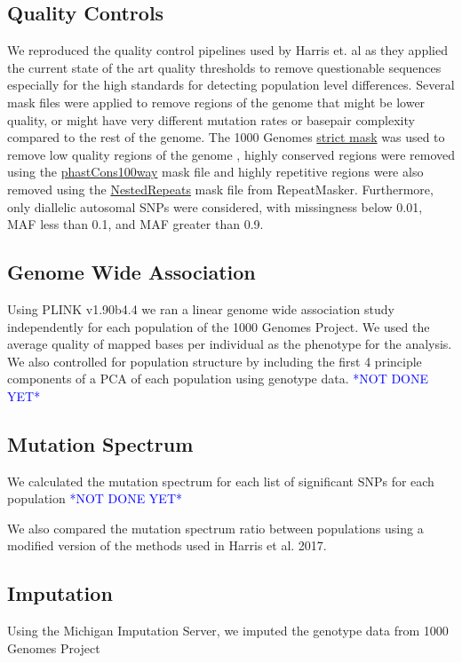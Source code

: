 \documentclass[]{elife}
\newcommand{\todo}[1]{\textcolor{blue}{*#1*}}
\begin{document}
\subsection{Quality Controls}
We reproduced the quality control pipelines used by Harris et. al as they applied the current state of the art quality thresholds to remove questionable sequences especially for the high standards for detecting population level differences. 
Several mask files were applied to remove regions of the genome that might be lower quality, or might have very different mutation rates or basepair complexity compared to the rest of the genome. 
The  1000 Genomes \href{http://ftp.1000genomes.ebi.ac.uk/vol1/ftp/release/20130502/supporting/accessible_genome_masks/20141020.strict_mask.whole_genome.bed}{strict mask} was used to remove low quality regions of the genome , highly conserved regions were removed using the \href{http://hgdownload.cse.ucsc.edu/goldenPath/hg19/database/phastConsElements100way.txt.gz}{phastCons100way} mask file and highly repetitive regions were also removed using the \href{http://hgdownload.cse.ucsc.edu/goldenpath/hg19/database/nestedRepeats.txt.gz}{NestedRepeats} mask file from RepeatMasker. 
Furthermore, only diallelic autosomal SNPs were considered, with missingness below 0.01, MAF less than 0.1, and MAF greater than 0.9.

\subsection{Genome Wide Association}

Using PLINK v1.90b4.4 we ran a linear genome wide association study independently for each population of the 1000 Genomes Project. We used the average quality of mapped bases per individual as the phenotype for the analysis. We also controlled for population structure by including the first 4 principle components of a PCA of each population using genotype data. \todo{NOT DONE YET}

\subsection{Mutation Spectrum}
We calculated the mutation spectrum for each list of significant SNPs for each population \todo{NOT DONE YET}

We also compared the mutation spectrum ratio between populations using a modified version of the methods used in Harris et al. 2017. 

\subsection{Imputation}
Using the Michigan Imputation Server, we imputed the genotype data from 1000 Genomes Project




  
\end{document}
